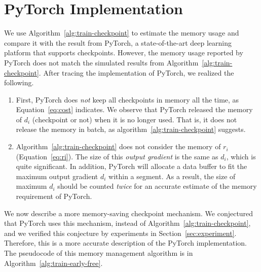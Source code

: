 \section{PyTorch Implementation}\label{sec:dynamic_checkpoint}

We use Algorithm~\ref{alg:train-checkpoint} to estimate the memory usage and compare it with the result from PyTorch, a state-of-the-art deep learning platform that supports checkpoints. 
However, the memory usage reported by PyTorch does not match the simulated results from Algorithm~\ref{alg:train-checkpoint}.
After tracing the implementation of PyTorch, we realized the following.

\begin{enumerate}
\item First, PyTorch does {\em not} keep all checkpoints in memory all the time, as Equation~\ref{eq:cost} indicates.  
We observe that PyTorch released the memory of $d_i$ (checkpoint or not) when it is no longer used.
That is, it does not release the memory in batch, as algorithm~\ref{alg:train-checkpoint} suggests.
\item Algorithm~\ref{alg:train-checkpoint} does not consider the memory of $r_i$ (Equation~\ref{eq:ri}).
The size of this {\em output gradient} is the same as $d_i$, which is quite significant.
In addition, PyTorch will allocate a data buffer to fit the maximum output gradient $d_i$ within a segment.
As a result, the size of maximum $d_i$ should be counted {\em twice} for an accurate estimate of the memory requirement of PyTorch. 
\end{enumerate}

We now describe a more memory-saving checkpoint mechanism. 
We conjectured that PyTorch uses this mechanism, instead of Algorithm~\ref{alg:train-checkpoint},
and we verified this conjecture by experiments in Section~\ref{sec:experiment}.
Therefore, this is a more accurate description of the PyTorch implementation.
The pseudocode of this memory management algorithm is in Algorithm~\ref{alg:train-early-free}.

